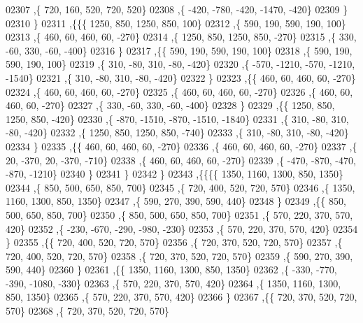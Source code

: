 \begin{DoxyCode}
02307     ,\{   720,   160,   520,   720,   520\}
02308     ,\{  -420,  -780,  -420, -1470,  -420\}
02309     \}
02310    \}
02311   ,\{\{\{  1250,   850,  1250,   850,   100\}
02312     ,\{   590,   190,   590,   190,   100\}
02313     ,\{   460,    60,   460,    60,  -270\}
02314     ,\{  1250,   850,  1250,   850,  -270\}
02315     ,\{   330,   -60,   330,   -60,  -400\}
02316     \}
02317    ,\{\{   590,   190,   590,   190,   100\}
02318     ,\{   590,   190,   590,   190,   100\}
02319     ,\{   310,   -80,   310,   -80,  -420\}
02320     ,\{  -570, -1210,  -570, -1210, -1540\}
02321     ,\{   310,   -80,   310,   -80,  -420\}
02322     \}
02323    ,\{\{   460,    60,   460,    60,  -270\}
02324     ,\{   460,    60,   460,    60,  -270\}
02325     ,\{   460,    60,   460,    60,  -270\}
02326     ,\{   460,    60,   460,    60,  -270\}
02327     ,\{   330,   -60,   330,   -60,  -400\}
02328     \}
02329    ,\{\{  1250,   850,  1250,   850,  -420\}
02330     ,\{  -870, -1510,  -870, -1510, -1840\}
02331     ,\{   310,   -80,   310,   -80,  -420\}
02332     ,\{  1250,   850,  1250,   850,  -740\}
02333     ,\{   310,   -80,   310,   -80,  -420\}
02334     \}
02335    ,\{\{   460,    60,   460,    60,  -270\}
02336     ,\{   460,    60,   460,    60,  -270\}
02337     ,\{    20,  -370,    20,  -370,  -710\}
02338     ,\{   460,    60,   460,    60,  -270\}
02339     ,\{  -470,  -870,  -470,  -870, -1210\}
02340     \}
02341    \}
02342   \}
02343  ,\{\{\{\{  1350,  1160,  1300,   850,  1350\}
02344     ,\{   850,   500,   650,   850,   700\}
02345     ,\{   720,   400,   520,   720,   570\}
02346     ,\{  1350,  1160,  1300,   850,  1350\}
02347     ,\{   590,   270,   390,   590,   440\}
02348     \}
02349    ,\{\{   850,   500,   650,   850,   700\}
02350     ,\{   850,   500,   650,   850,   700\}
02351     ,\{   570,   220,   370,   570,   420\}
02352     ,\{  -230,  -670,  -290,  -980,  -230\}
02353     ,\{   570,   220,   370,   570,   420\}
02354     \}
02355    ,\{\{   720,   400,   520,   720,   570\}
02356     ,\{   720,   370,   520,   720,   570\}
02357     ,\{   720,   400,   520,   720,   570\}
02358     ,\{   720,   370,   520,   720,   570\}
02359     ,\{   590,   270,   390,   590,   440\}
02360     \}
02361    ,\{\{  1350,  1160,  1300,   850,  1350\}
02362     ,\{  -330,  -770,  -390, -1080,  -330\}
02363     ,\{   570,   220,   370,   570,   420\}
02364     ,\{  1350,  1160,  1300,   850,  1350\}
02365     ,\{   570,   220,   370,   570,   420\}
02366     \}
02367    ,\{\{   720,   370,   520,   720,   570\}
02368     ,\{   720,   370,   520,   720,   570\}

\end{DoxyCode}
